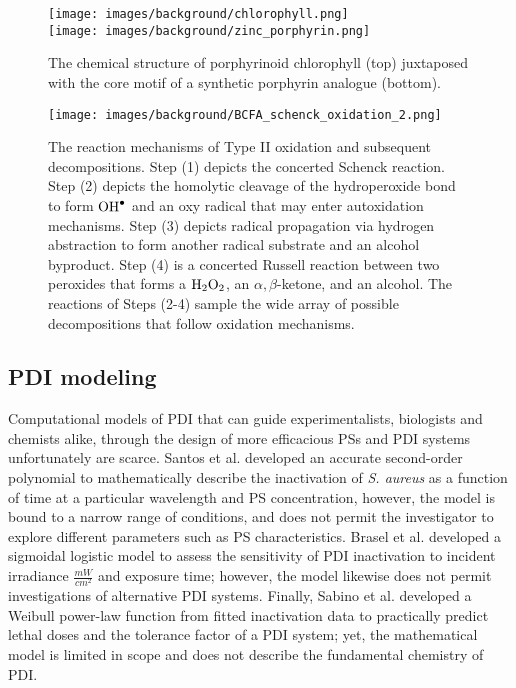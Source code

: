 \begin{figure}
    \centering
    \texttt{[image: images/background/chlorophyll.png]} \\
    \midrule
    \texttt{[image: images/background/zinc\_porphyrin.png]}
    \caption{
        The chemical structure of porphyrinoid chlorophyll (top) juxtaposed with the core motif of a synthetic porphyrin analogue (bottom).
    }
    \label{zinc_porphyrin}
\end{figure}

\begin{figure}[t]
    \centering
    \texttt{[image: images/background/BCFA\_schenck\_oxidation\_2.png]}
    \caption{
         The reaction mechanisms of Type II oxidation and subsequent decompositions. Step (1) depicts the concerted \cite{Foote1968PhotosensitizedOxygen} Schenck reaction. Step (2) depicts the homolytic cleavage of the hydroperoxide bond to form $\ce{OH^.}$ and an oxy radical that may enter autoxidation mechanisms. Step (3) depicts radical propagation via hydrogen abstraction to form another radical substrate and an alcohol byproduct. Step (4) is a concerted Russell reaction \cite{Russell1957Deuterium-isotopeRadicals,Howard1968TheMechanism} between two peroxides that forms a $\ce{H2O2}$, an $\alpha,\beta$-ketone, and an alcohol. The reactions of Steps (2-4) sample the wide array of possible decompositions that follow oxidation mechanisms.
    }
    \label{schenck_mechanism}
\end{figure}

\subsection{PDI modeling}
Computational models of PDI that can guide experimentalists, biologists and chemists alike, through the design of more efficacious PSs and PDI systems unfortunately are scarce. Santos et al. \cite{Santos2020ApplicationAureus} developed an accurate second-order polynomial to mathematically describe the inactivation of \textit{S. aureus} as a function of time at a particular wavelength and PS concentration, however, the model is bound to a narrow range of conditions, and does not permit the investigator to explore different parameters such as PS characteristics. Brasel et al. \cite{Brasel2020AnAgalactiae} developed a sigmoidal logistic model to assess the sensitivity of PDI inactivation to incident irradiance $\frac{mW}{cm^2}$ and exposure time; however, the model likewise does not permit investigations of alternative PDI systems. Finally, Sabino et al. \cite{Sabino2019InactivationTherapy} developed a Weibull power-law function from fitted inactivation data to practically predict lethal doses and the tolerance factor of a PDI system; yet, the mathematical model is limited in scope and does not describe the fundamental chemistry of PDI. 


